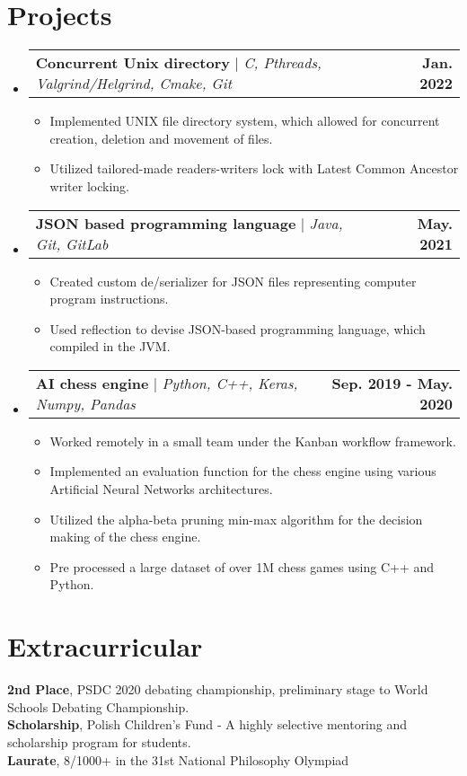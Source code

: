 \documentclass[letterpaper,11pt]{article}
\makeatletter
\newcommand{\resumeItem}[1]{
  \item\small{
    {#1 \vspace{-2pt}}
  }
}
\newcommand{\resumeProjectHeading}[2]{
    \item
    \begin{tabular*}{1.001\textwidth}{l@{\extracolsep{\fill}}r}
      \small#1 & \textbf{\small #2}\\
    \end{tabular*}\vspace{-7pt}
}
\newcommand{\resumeSubHeadingListStart}{\begin{itemize}[leftmargin=0.0in, label={}]}
\newcommand{\resumeSubHeadingListEnd}{\end{itemize}}
\newcommand{\resumeItemListStart}{\begin{itemize}}
\newcommand{\resumeItemListEnd}{\end{itemize}\vspace{-5pt}}
\makeatother
\begin{document}
\section{Projects}
    \vspace{-5pt}
    \resumeSubHeadingListStart
          \resumeProjectHeading
          {\textbf{Concurrent Unix directory} $|$ \emph{C, Pthreads, Valgrind/Helgrind, Cmake,  Git}}{Jan. 2022}
          \resumeItemListStart
            \resumeItem{Implemented UNIX file directory system, which allowed for concurrent creation, deletion and movement of files. }
            \resumeItem{Utilized tailored-made readers-writers lock with Latest Common Ancestor writer locking.}
        \resumeItemListEnd
         \vspace{-13pt}
         
      \resumeProjectHeading
          {\textbf{JSON based programming language} $|$ \emph{Java, Git, GitLab}}{May. 2021}
          \resumeItemListStart 
            \resumeItem{Created custom de/serializer for JSON files representing computer program instructions.}
            \resumeItem{Used reflection to devise JSON-based programming language, which compiled in the JVM. }
          \resumeItemListEnd
          \vspace{-13pt}
      \resumeProjectHeading
          {\textbf{AI chess engine} $|$ \emph{Python, C++, Keras, Numpy, Pandas}}{Sep. 2019 - May. 2020}
          \resumeItemListStart
            \resumeItem{Worked remotely in a small team under the Kanban workflow framework.}
            \resumeItem{Implemented an evaluation function for the chess engine using various Artificial Neural Networks architectures.}
            \resumeItem{Utilized the alpha-beta pruning min-max algorithm for the decision making of the chess engine.}
            \resumeItem{Pre processed a large dataset of over 1M chess games using C++ and Python.}
          \resumeItemListEnd
        \resumeSubHeadingListEnd
\vspace{-10pt}


\section{Extracurricular}
 \begin{itemize}[leftmargin=0.15in, label={}]
    \small{\item{
     \textbf{2nd Place}{, PSDC 2020 debating championship, preliminary stage to World Schools Debating Championship.} \\
     \textbf{Scholarship}{, Polish Children’s Fund ‑ A highly selective mentoring and scholarship program for students.} \\
     \textbf{Laurate}{, 8/1000+ in the 31st National Philosophy Olympiad} \\
    }}
 \end{itemize}
 \vspace{-16pt}
 
\end{document}
